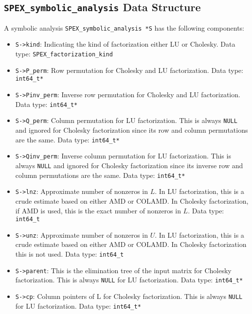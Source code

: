 \documentclass[12pt,oneside]{book}
\theoremstyle{definition}
\begin{document}
\subsection{\texttt{SPEX\_symbolic\_analysis} Data Structure} \label{ss:SPEX_symbolic_struct}
A symbolic analysis \verb|SPEX_symbolic_analysis *S| has the following components:

\begin{itemize}
\item \verb|S->kind|: Indicating the kind of factorization either LU or Cholesky. Data type: \verb|SPEX_factorization_kind|

\item \verb|S->P_perm|: Row permutation for Cholesky and LU factorization. Data type: \verb|int64_t*|

\item \verb|S->Pinv_perm|: Inverse row permutation for Cholesky and LU factorization. Data type: \verb|int64_t*|

\item \verb|S->Q_perm|: Column permutation for LU factorization. This is always \verb|NULL| and ignored for Cholesky factorization since its row and column permutations are the same. Data type: \verb|int64_t*|

\item \verb|S->Qinv_perm|: Inverse column permutation for LU factorization. This is always \verb|NULL| and ignored for Cholesky factorization since its inverse row and column permutations are the same. Data type: \verb|int64_t*|

\item \verb|S->lnz|: Approximate number of nonzeros in $L$. In LU factorization, this is a crude estimate based on either AMD or COLAMD. In Cholesky factorization, if AMD is used, this is the exact number of nonzeros in $L$. Data type: \verb|int64_t|

\item \verb|S->unz|: Approximate number of nonzeros in $U$. In LU factorization, this is a crude estimate based on either AMD or COLAMD. In Cholesky factorization this is not used. Data type: \verb|int64_t|

\item \verb|S->parent|: This is the elimination tree of the input matrix for Cholesky factorization. This is always \verb|NULL| for LU factorization. Data type: \verb|int64_t*|

\item \verb|S->cp|: Column pointers of L for Cholesky factorization. This is always \verb|NULL| for LU factorization. Data type: \verb|int64_t*|
\end{itemize}
\end{document}
